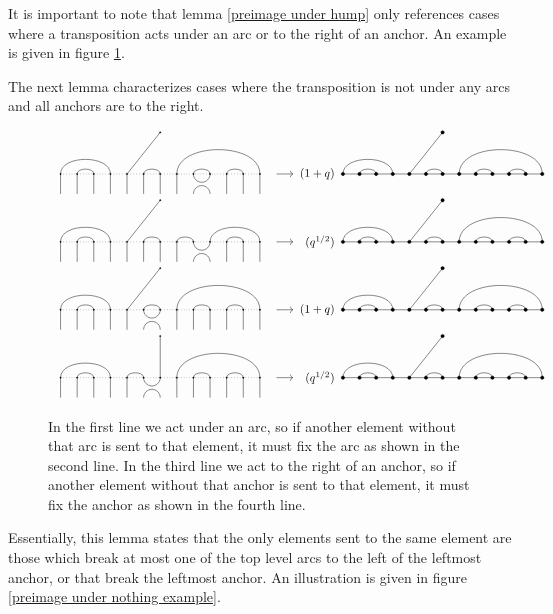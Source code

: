\documentclass{amsart}
\begin{document}
\vspace{5mm}
It is important to note that lemma \ref{preimage under hump} only references cases where a transposition acts under an arc or to the right of an anchor. An example is given in figure \ref{preimage under hump example}. 

The next lemma characterizes cases where the transposition is not under any arcs and all anchors are to the right.

\begin{figure}[b]
	\[
	\begin{tabular}{l l l l}
	\GeneralizedAction{13}{1/4,2/3,6/7,8/13,9/10,11/12}{1}{5/1}{5/4}{9}{1/4,2/3,6/7,8/13,9/10,11/12}{5/1}{(1+q)}\\
	
	\GeneralizedAction{13}{1/4,2/3,6/7,8/9,10/13,11/12}{1}{5/1}{5/4}{9}{1/4,2/3,6/7,8/13,9/10,11/12}{5/1}{(q^{1/2})}\\
	
	\GeneralizedAction{13}{1/4,2/3,6/7,8/13,9/10,11/12}{1}{5/1}{5/4}{6}{1/4,2/3,6/7,8/13,9/10,11/12}{5/1}{(1+q)}\\
	
	\GeneralizedAction{13}{1/4,2/3,5/6,8/13,9/10,11/12}{1}{7/1}{5/4}{6}{1/4,2/3,6/7,8/13,9/10,11/12}{5/1}{(q^{1/2})}\\
	
	\end{tabular}
	\]
	
	\caption{In the first line we act under an arc, so if another element without that arc is sent to that element, it must fix the arc as shown in the second line. In the third line we act to the right of an anchor, so if another element without that anchor is sent to that element, it must fix the anchor as shown in the fourth line. 
	}
	\label{preimage under hump example}
\end{figure}

Essentially, this lemma states that the only elements sent to the same element are those which break at most one of the top level arcs to the left of the leftmost anchor, or that break the leftmost anchor. An illustration is given in figure \ref{preimage under nothing example}.
\end{document}
